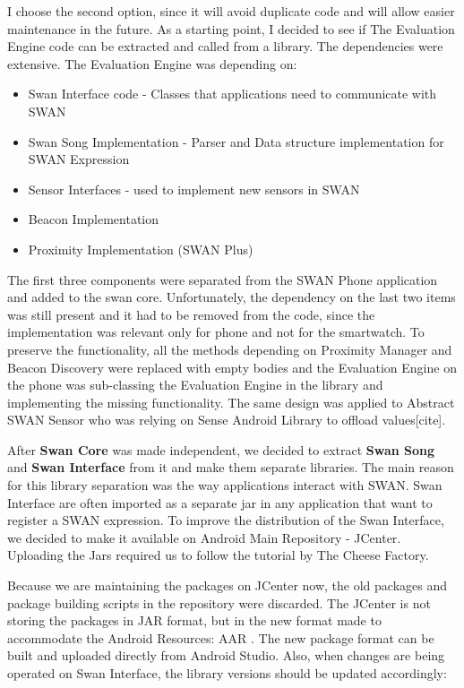 I choose the second option, since it will avoid duplicate code and will allow easier maintenance in the future. As a starting point, I decided to see if The Evaluation Engine
code can be extracted and called from a library. The dependencies were extensive. The Evaluation Engine was depending on:
\begin{itemize}
 \item Swan Interface code - Classes that applications need to communicate with SWAN
 \item Swan Song Implementation - Parser and Data structure implementation for SWAN Expression
 \item Sensor Interfaces - used to implement new sensors in SWAN
 \item Beacon Implementation
 \item Proximity Implementation (SWAN Plus)
\end{itemize}

The first three components were separated from the SWAN Phone application and added to the swan core. Unfortunately, the dependency on the last two items
was still present and it had to be removed from the code, since the implementation was relevant only for phone and not for the smartwatch.
To preserve the functionality, all the methods depending on Proximity Manager and Beacon Discovery were replaced with empty bodies and the Evaluation Engine on
the phone was sub-classing the Evaluation Engine in the library and implementing the missing functionality.
The same design was applied to Abstract SWAN Sensor who was relying on Sense Android Library to offload values[cite].

After \textbf{Swan Core} was made independent, we decided to extract \textbf{Swan Song} and \textbf{Swan Interface} from it and make them separate libraries.
The main reason for this library separation was the way applications interact with SWAN. Swan Interface are often imported as a separate jar in any application that want to register a 
SWAN expression. To improve the distribution of the Swan Interface, we decided to make it available on Android Main Repository - JCenter\cite{jcenter}. Uploading the Jars required us to follow the tutorial by The Cheese Factory\cite{jcenter_tutorial}.

Because we are maintaining the packages on JCenter now, the old packages and package building scripts  in the repository were discarded.
The JCenter  is not storing the packages in JAR format, but in the new format made to accommodate the Android Resources: AAR \cite{aar_format}. 
The new package format can be built and uploaded directly from Android Studio. Also, when changes are being operated on Swan Interface, 
the library versions should be updated accordingly:


